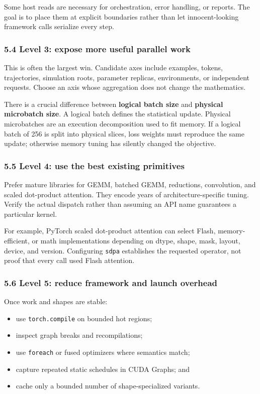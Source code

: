 \documentclass[
  10pt,
  letterpaper,
]{article}
\providecommand{\tightlist}{%
  \setlength{\itemsep}{0pt}\setlength{\parskip}{0pt}}
\begin{document}
Some host reads are necessary for orchestration, error handling, or
reports. The goal is to place them at explicit boundaries rather than
let innocent-looking framework calls serialize every step.

\subsubsection{5.4 Level 3: expose more useful parallel
work}\label{54-level-3-expose-more-useful-parallel-work}

This is often the largest win. Candidate axes include examples, tokens,
trajectories, simulation roots, parameter replicas, environments, or
independent requests. Choose an axis whose aggregation does not change
the mathematics.

There is a crucial difference between \textbf{logical batch size} and
\textbf{physical microbatch size}. A logical batch defines the
statistical update. Physical microbatches are an execution decomposition
used to fit memory. If a logical batch of 256 is split into physical
slices, loss weights must reproduce the same update; otherwise memory
tuning has silently changed the objective.

\subsubsection{5.5 Level 4: use the best existing
primitives}\label{55-level-4-use-the-best-existing-primitives}

Prefer mature libraries for GEMM, batched GEMM, reductions, convolution,
and scaled dot-product attention. They encode years of
architecture-specific tuning. Verify the actual dispatch rather than
assuming an API name guarantees a particular kernel.

For example, PyTorch scaled dot-product attention can select Flash,
memory-efficient, or math implementations depending on dtype, shape,
mask, layout, device, and version. Configuring \texttt{sdpa} establishes
the requested operator, not proof that every call used Flash attention.

\subsubsection{5.6 Level 5: reduce framework and launch
overhead}\label{56-level-5-reduce-framework-and-launch-overhead}

Once work and shapes are stable:

\begin{itemize}
\tightlist
\item
  use \texttt{torch.compile} on bounded hot regions;
\item
  inspect graph breaks and recompilations;
\item
  use \texttt{foreach} or fused optimizers where semantics match;
\item
  capture repeated static schedules in CUDA Graphs; and
\item
  cache only a bounded number of shape-specialized variants.
\end{itemize}
\end{document}
